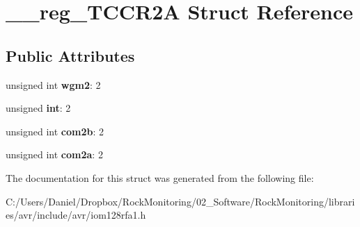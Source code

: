 \hypertarget{struct____reg___t_c_c_r2_a}{}\section{\+\_\+\+\_\+reg\+\_\+\+T\+C\+C\+R2A Struct Reference}
\label{struct____reg___t_c_c_r2_a}
\subsection*{Public Attributes}
\begin{DoxyCompactItemize}
\item 
unsigned int {\bfseries wgm2}\+: 2\hypertarget{struct____reg___t_c_c_r2_a_ad98ea5a360891559f6acd684436b9298}{}\label{struct____reg___t_c_c_r2_a_ad98ea5a360891559f6acd684436b9298}

\item 
unsigned {\bfseries int}\+: 2\hypertarget{struct____reg___t_c_c_r2_a_a6c8488b9b435e28f8fa72f637ad239be}{}\label{struct____reg___t_c_c_r2_a_a6c8488b9b435e28f8fa72f637ad239be}

\item 
unsigned int {\bfseries com2b}\+: 2\hypertarget{struct____reg___t_c_c_r2_a_a23578f61bf197afe549c2c40498d2c47}{}\label{struct____reg___t_c_c_r2_a_a23578f61bf197afe549c2c40498d2c47}

\item 
unsigned int {\bfseries com2a}\+: 2\hypertarget{struct____reg___t_c_c_r2_a_a046605486e6e1b5756e4e4e1c8c2bca5}{}\label{struct____reg___t_c_c_r2_a_a046605486e6e1b5756e4e4e1c8c2bca5}

\end{DoxyCompactItemize}


The documentation for this struct was generated from the following file\+:\begin{DoxyCompactItemize}
\item 
C\+:/\+Users/\+Daniel/\+Dropbox/\+Rock\+Monitoring/02\+\_\+\+Software/\+Rock\+Monitoring/libraries/avr/include/avr/iom128rfa1.\+h\end{DoxyCompactItemize}

